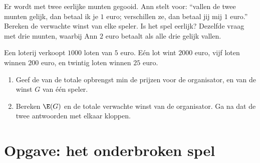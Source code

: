 \begin{exercise}[$\star\star$]\label{exo:g11:prob:10}
Er wordt met twee eerlijke munten gegooid. Ann stelt voor: ``vallen de twee
munten gelijk, dan betaal ik je $1$ euro; verschillen ze, dan betaal jij mij
$1$ euro.'' Bereken de verwachte winst van elke speler. Is het spel
eerlijk? Dezelfde vraag met drie munten, waarbij Ann $2$ euro betaalt als
alle drie gelijk vallen.
\end{exercise}

\begin{exercise}[$\star\star\star$]\label{exo:g11:prob:11}
Een loterij verkoopt $1000$ loten van $5$ euro. Eén lot wint $2000$ euro,
vijf loten winnen $200$ euro, en twintig loten winnen $25$ euro.
\begin{enumerate}
  \item Geef de  van de totale opbrengst min de prijzen voor de
        organisator, en van de winst $G$ van één speler.
  \item Bereken $\E(G)$ en de totale verwachte winst van de organisator. Ga
        na dat de twee antwoorden met elkaar kloppen.
\end{enumerate}
\end{exercise}

\section{Opgave: het onderbroken spel}

